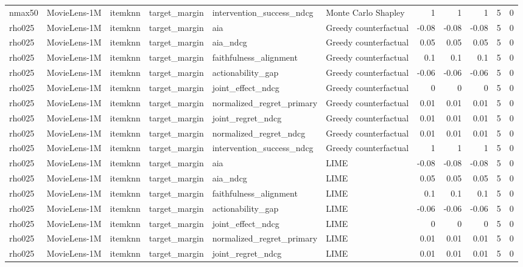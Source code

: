 \begin{table}[t]
{\begin{tabular}{llllllrrrrr}
nmax50 & MovieLens-1M & itemknn & target\_margin & intervention\_success\_ndcg & Monte Carlo Shapley & 1 & 1 & 1 & 5 & 0 \\
rho025 & MovieLens-1M & itemknn & target\_margin & aia & Greedy counterfactual & -0.08 & -0.08 & -0.08 & 5 & 0 \\
rho025 & MovieLens-1M & itemknn & target\_margin & aia\_ndcg & Greedy counterfactual & 0.05 & 0.05 & 0.05 & 5 & 0 \\
rho025 & MovieLens-1M & itemknn & target\_margin & faithfulness\_alignment & Greedy counterfactual & 0.1 & 0.1 & 0.1 & 5 & 0 \\
rho025 & MovieLens-1M & itemknn & target\_margin & actionability\_gap & Greedy counterfactual & -0.06 & -0.06 & -0.06 & 5 & 0 \\
rho025 & MovieLens-1M & itemknn & target\_margin & joint\_effect\_ndcg & Greedy counterfactual & 0 & 0 & 0 & 5 & 0 \\
rho025 & MovieLens-1M & itemknn & target\_margin & normalized\_regret\_primary & Greedy counterfactual & 0.01 & 0.01 & 0.01 & 5 & 0 \\
rho025 & MovieLens-1M & itemknn & target\_margin & joint\_regret\_ndcg & Greedy counterfactual & 0.01 & 0.01 & 0.01 & 5 & 0 \\
rho025 & MovieLens-1M & itemknn & target\_margin & normalized\_regret\_ndcg & Greedy counterfactual & 0.01 & 0.01 & 0.01 & 5 & 0 \\
rho025 & MovieLens-1M & itemknn & target\_margin & intervention\_success\_ndcg & Greedy counterfactual & 1 & 1 & 1 & 5 & 0 \\
rho025 & MovieLens-1M & itemknn & target\_margin & aia & LIME & -0.08 & -0.08 & -0.08 & 5 & 0 \\
rho025 & MovieLens-1M & itemknn & target\_margin & aia\_ndcg & LIME & 0.05 & 0.05 & 0.05 & 5 & 0 \\
rho025 & MovieLens-1M & itemknn & target\_margin & faithfulness\_alignment & LIME & 0.1 & 0.1 & 0.1 & 5 & 0 \\
rho025 & MovieLens-1M & itemknn & target\_margin & actionability\_gap & LIME & -0.06 & -0.06 & -0.06 & 5 & 0 \\
rho025 & MovieLens-1M & itemknn & target\_margin & joint\_effect\_ndcg & LIME & 0 & 0 & 0 & 5 & 0 \\
rho025 & MovieLens-1M & itemknn & target\_margin & normalized\_regret\_primary & LIME & 0.01 & 0.01 & 0.01 & 5 & 0 \\
rho025 & MovieLens-1M & itemknn & target\_margin & joint\_regret\_ndcg & LIME & 0.01 & 0.01 & 0.01 & 5 & 0 \\

\end{tabular}}
\end{table}
